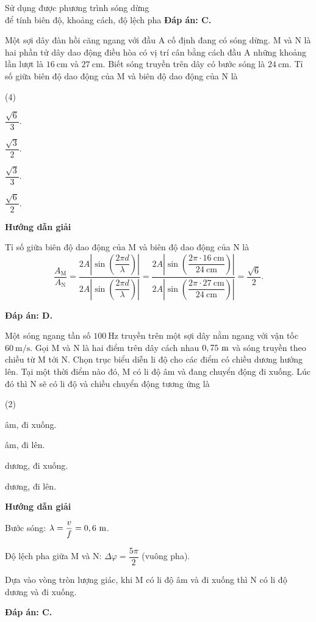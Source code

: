 \begin{dang}{Sử dụng được phương trình sóng dừng\\ để tính biên độ, khoảng cách, độ lệch pha}
{		\textbf{Đáp án: C.}
	}
	{Một sợi dây đàn hồi căng ngang với đầu A cố định đang có sóng dừng. M và N là hai phần tử dây dao động điều hòa có vị trí cân bằng cách đầu A những khoảng lần lượt là $\SI{16}{\centi\meter}$ và $\SI{27}{\centi\meter}$. Biết sóng truyền trên dây có bước sóng là $\SI{24}{\centi\meter}$. Tỉ số giữa biên độ dao động của M và biên độ dao động của N là
		\begin{mcq} (4)
			\item $\dfrac{\sqrt{6}}{3}$.
			\item $\dfrac{\sqrt{3}}{2}$.
			\item $\dfrac{\sqrt{3}}{3}$.
			\item $\dfrac{\sqrt{6}}{2}$.
		\end{mcq}
	}
	{\begin{center}
			\textbf{Hướng dẫn giải}
		\end{center}
		
		Tỉ số giữa biên độ dao động của M và biên độ dao động của N là
		\begin{equation*}
			\dfrac{A_\text{M}}{A_\text{N}}=\dfrac{2A\left| \sin \left( \dfrac{2\pi d}{\lambda} \right)\right| }{2A \left|\sin\left(\dfrac{2\pi d}{\lambda}\right)\right| }=\dfrac{2A\left| \sin \left( \dfrac{2\pi\cdot \SI{16}{\centi\meter}}{\SI{24}{\centi\meter}} \right)\right| }{2A\left| \sin \left(\dfrac{2\pi\cdot\SI{27}{\centi\meter}}{\SI{24}{\centi\meter}}\right)\right| }=\dfrac{\sqrt{6}}{2}.
		\end{equation*}
		
		
		\textbf{Đáp án: D.}
	}
	{Một sóng ngang tần số $100\ \text{Hz}$ truyền trên một sợi dây nằm ngang với vận tốc $60\ \text{m/s}$. Gọi M và N là hai điểm trên dây cách nhau $0,75\ \text m$ và sóng truyền theo chiều từ M tới N. Chọn trục biểu diễn li độ cho các điểm có chiều dương hướng lên. Tại một thời điểm nào đó, M có li độ âm và đang chuyển động đi xuống. Lúc đó thì N sẽ có li độ và chiều chuyển động tương ứng là
		\begin{mcq}(2)
			\item âm, đi xuống.
			\item âm, đi lên.
			\item dương, đi xuống.
			\item dương, đi lên.
		\end{mcq}
	}
	{\begin{center}
			\textbf{Hướng dẫn giải}
		\end{center}
		
		Bước sóng: $\lambda = \dfrac{v}{f}=0,6\ \text m$.
		
		Độ lệch pha giữa M và N: $\Delta \varphi = \dfrac{5\pi}{2}$ (vuông pha).
		
		Dựa vào vòng tròn lượng giác, khi M có li độ âm và đi xuống thì N có li độ dương và đi xuống.
		
		\textbf{Đáp án: C.}
	}	
\end{dang}